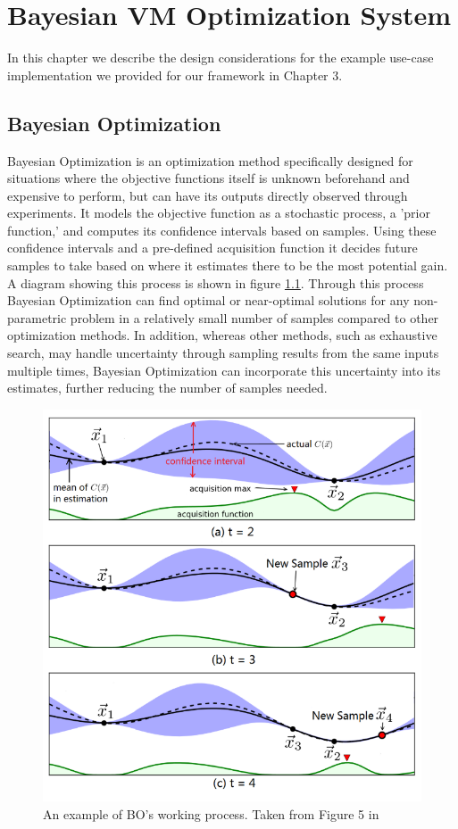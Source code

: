 \documentclass{report}
\begin{document}
\chapter{Bayesian VM Optimization System}
In this chapter we describe the design considerations for the example use-case implementation we provided for our framework in Chapter 3.

\section{Bayesian Optimization}
Bayesian Optimization is an optimization method specifically designed for situations where the objective functions itself is unknown beforehand and expensive to perform, but can have its outputs directly observed through experiments\cite{Snoek2012}. It models the objective function as a stochastic process, a 'prior function,' and computes its confidence intervals based on samples. Using these confidence intervals and a pre-defined acquisition function it decides future samples to take based on where it estimates there to be the most potential gain. A diagram showing this process is shown in figure \ref{fig:cherrypic}. Through this process Bayesian Optimization can find optimal or near-optimal solutions for any non-parametric problem in a relatively small number of samples compared to other optimization methods. In addition, whereas other methods, such as exhaustive search, may handle uncertainty through sampling results from the same inputs multiple times, Bayesian Optimization can incorporate this uncertainty into its estimates, further reducing the number of samples needed.

\begin{figure}[!hb]
  \centering
   \includegraphics[scale=0.5]{Cherrypic}
  \caption{An example of BO's working process. Taken from Figure 5 in \cite{Alipourfard2017}}
  \label{fig:cherrypic}
\end{figure}
\end{document}
